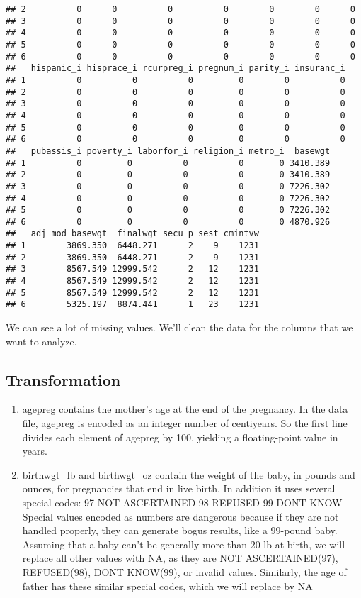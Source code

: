\documentclass[]{article}
\begin{document}
\begin{verbatim}
## 2          0      0          0          0        0        0      0
## 3          0      0          0          0        0        0      0
## 4          0      0          0          0        0        0      0
## 5          0      0          0          0        0        0      0
## 6          0      0          0          0        0        0      0
##   hispanic_i hisprace_i rcurpreg_i pregnum_i parity_i insuranc_i
## 1          0          0          0         0        0          0
## 2          0          0          0         0        0          0
## 3          0          0          0         0        0          0
## 4          0          0          0         0        0          0
## 5          0          0          0         0        0          0
## 6          0          0          0         0        0          0
##   pubassis_i poverty_i laborfor_i religion_i metro_i  basewgt
## 1          0         0          0          0       0 3410.389
## 2          0         0          0          0       0 3410.389
## 3          0         0          0          0       0 7226.302
## 4          0         0          0          0       0 7226.302
## 5          0         0          0          0       0 7226.302
## 6          0         0          0          0       0 4870.926
##   adj_mod_basewgt  finalwgt secu_p sest cmintvw
## 1        3869.350  6448.271      2    9    1231
## 2        3869.350  6448.271      2    9    1231
## 3        8567.549 12999.542      2   12    1231
## 4        8567.549 12999.542      2   12    1231
## 5        8567.549 12999.542      2   12    1231
## 6        5325.197  8874.441      1   23    1231
\end{verbatim}

We can see a lot of missing values. We'll clean the data for the columns
that we want to analyze.

\subsection{Transformation}\label{transformation}

\begin{enumerate}
\def\labelenumi{\arabic{enumi}.}
\item
  agepreg contains the mother's age at the end of the pregnancy. In the
  data file, agepreg is encoded as an integer number of centiyears. So
  the first line divides each element of agepreg by 100, yielding a
  floating-point value in years.
\item
  birthwgt\_lb and birthwgt\_oz contain the weight of the baby, in
  pounds and ounces, for pregnancies that end in live birth. In addition
  it uses several special codes: 97 NOT ASCERTAINED 98 REFUSED 99 DONT
  KNOW Special values encoded as numbers are dangerous because if they
  are not handled properly, they can generate bogus results, like a
  99-pound baby. Assuming that a baby can't be generally more than 20 lb
  at birth, we will replace all other values with NA, as they are NOT
  ASCERTAINED(97), REFUSED(98), DONT KNOW(99), or invalid values.
  Similarly, the age of father has these similar special codes, which we
  will replace by NA
\end{enumerate}
\end{document}
